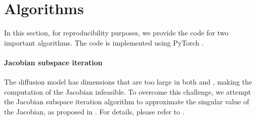 
\section{Algorithms}
\label{appendixsec:algorithm}

In this section, for reproducibility purposes, we provide the code for two important algorithms. The code is implemented using PyTorch \cite{paszke2017automatic}.

\paragraph{Jacobian subspace iteration}
The diffusion model has dimensions that are too large in both \exspace{} and \ehspace{}, making the computation of the Jacobian infeasible. To overcome this challenge, we attempt the Jacobian subspace iteration algorithm to approximate the singular value of the Jacobian, as proposed in \cite{haas2023discovering}. For details, please refer to \citet{haas2023discovering}.

